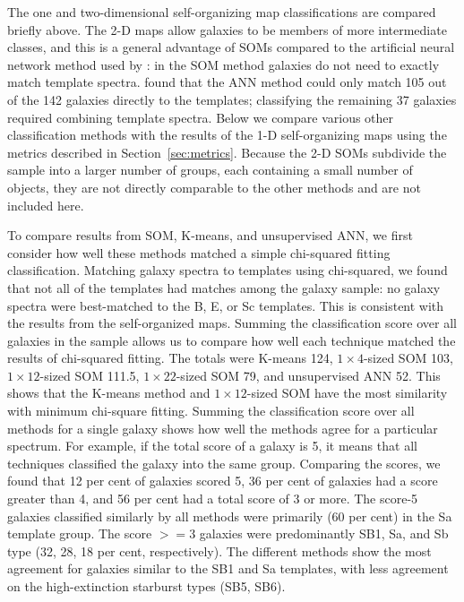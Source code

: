     The one and two-dimensional self-organizing map classifications are compared briefly above. 
    The 2-D maps allow galaxies to be members of more intermediate classes, and this is a general advantage of SOMs compared to the artificial neural network method used by : in the SOM method galaxies do not need to exactly match template spectra. 
     found that the ANN method could only match 105 out of the 142 galaxies directly to the  templates; classifying the remaining 37 galaxies required combining template spectra.
    Below we compare various other classification methods with the results of the 1-D self-organizing maps using the metrics described in Section~\ref{sec:metrics}.
    Because the 2-D SOMs subdivide the sample into a larger number of groups, each containing a small number of objects, they are not directly comparable to the other methods and are not included here.
       
       To compare results from SOM, K-means, and unsupervised ANN, we first consider how well these methods matched a simple chi-squared fitting classification. 
        Matching galaxy spectra to templates using chi-squared, we found that not all of the templates had matches among the galaxy sample: no galaxy spectra were best-matched to the B, E, or Sc templates. 
        This is consistent with the results from the self-organized maps.
        Summing the classification score over all galaxies in the sample allows us to compare how well each technique matched the results of chi-squared fitting.
        The totals were K-means 124, $1\times4$-sized SOM 103, $1\times12$-sized SOM 111.5, $1\times22$-sized SOM 79, and unsupervised ANN 52.
        This shows that the K-means method and $1\times12$-sized SOM have the most similarity with minimum chi-square fitting.
        Summing the classification score over all methods for a single galaxy shows how well the methods agree for a particular spectrum.
        For example, if the total score of a galaxy is 5, it means that all techniques classified the galaxy into the same group.
        Comparing the scores, we found that 12 per cent of galaxies scored 5, 36 per cent of galaxies had a score greater than 4, and 56 per cent had a total score of 3 or more.
        The score-5 galaxies classified similarly by all methods were primarily (60 per cent) in the Sa template group. 
        The score $>=3$ galaxies were predominantly SB1, Sa, and Sb type (32, 28, 18 per cent, respectively).
        The different methods show the most agreement for galaxies similar to the SB1 and Sa templates, with less agreement on the high-extinction starburst types (SB5, SB6).
           
